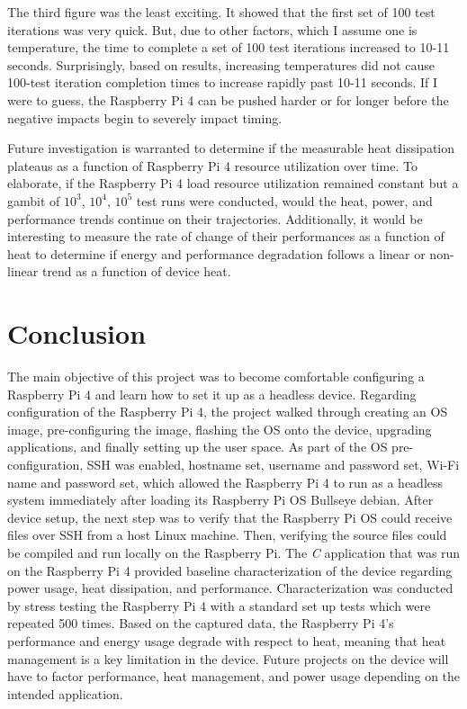 \documentclass[journal]{IEEEtran}
\begin{document}
    The third figure was the least exciting. It showed that the first set of 100 test iterations was very quick. 
    But, due to other factors, which I assume one is temperature, the time to complete a set of 100 test iterations increased to 10-11 seconds.
    Surprisingly, based on results, increasing temperatures did not cause 100-test iteration completion times to increase rapidly past 10-11 seconds.
    If I were to guess, the Raspberry Pi 4 can be pushed harder or for longer before the negative impacts begin to severely impact timing. 

    Future investigation is warranted to determine if the measurable heat dissipation plateaus as a function of Raspberry Pi 4 resource utilization over time. 
    To elaborate, if the Raspberry Pi 4 load resource utilization remained constant but a gambit of $10^{3}$, $10^{4}$, $10^{5}$ test runs were conducted, would the heat, power, and performance trends continue on their trajectories. 
    Additionally, it would be interesting to measure the rate of change of their performances as a function of heat to determine if energy and performance degradation follows a linear or non-linear trend as a function of device heat.

    \section{Conclusion}

    The main objective of this project was to become comfortable configuring a Raspberry Pi 4 and learn how to set it up as a headless device.
    Regarding configuration of the Raspberry Pi 4, the project walked through creating an OS image, pre-configuring the image, flashing the OS onto the device, upgrading applications, and finally setting up the user space. 
    As part of the OS pre-configuration, SSH was enabled, hostname set, username and password set, Wi-Fi name and password set, which allowed the Raspberry Pi 4 to run as a headless system immediately after loading its Raspberry Pi OS Bullseye debian.
    After device setup, the next step was to verify that the Raspberry Pi OS could receive files over SSH from a host Linux machine. 
    Then, verifying the source files could be compiled and run locally on the Raspberry Pi.
    The \emph{C} application that was run on the Raspberry Pi 4 provided baseline characterization of the device regarding power usage, heat dissipation, and performance. 
    Characterization was conducted by stress testing the Raspberry Pi 4 with a standard set up tests which were repeated 500 times.
    Based on the captured data, the Raspberry Pi 4's performance and energy usage degrade with respect to heat, meaning that heat management is a key limitation in the device.
    Future projects on the device will have to factor performance, heat management, and power usage depending on the intended application.
\end{document}
